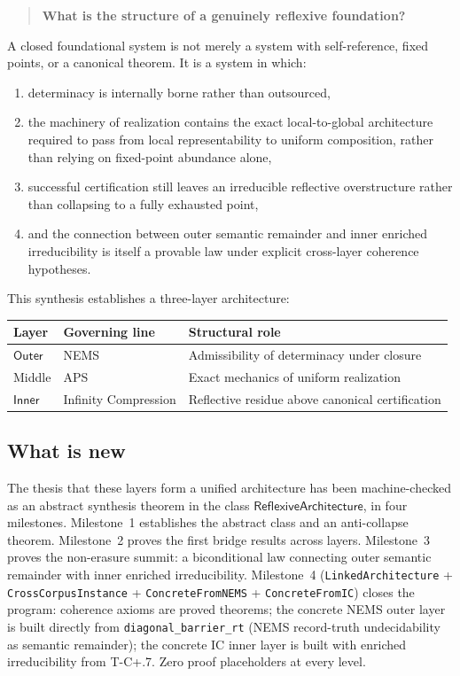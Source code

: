 \documentclass[11pt]{article}
\newcommand{\Outer}{\ensuremath{\mathsf{Outer}}}
\newcommand{\Inner}{\ensuremath{\mathsf{Inner}}}
\newcommand{\RAL}{\ensuremath{\mathsf{ReflexiveArchitecture}}}
\begin{document}
\begin{quote}
\textbf{What is the structure of a genuinely reflexive foundation?}
\end{quote}

A closed foundational system is not merely a system with self-reference, fixed points,
or a canonical theorem.  It is a system in which:
\begin{enumerate}[leftmargin=2em]
\item determinacy is internally borne rather than outsourced,
\item the machinery of realization contains the exact local-to-global architecture
required to pass from local representability to uniform composition, rather than
relying on fixed-point abundance alone,
\item successful certification still leaves an irreducible reflective overstructure
rather than collapsing to a fully exhausted point,
\item and the connection between outer semantic remainder and inner enriched
irreducibility is itself a provable law under explicit cross-layer coherence hypotheses.
\end{enumerate}

This synthesis establishes a three-layer architecture:

\begin{center}
\begin{tabular}{lll}
\toprule
Layer & Governing line & Structural role \\
\midrule
$\Outer$ & NEMS & Admissibility of determinacy under closure \\
Middle & APS & Exact mechanics of uniform realization \\
$\Inner$ & Infinity Compression & Reflective residue above canonical certification \\
\bottomrule
\end{tabular}
\end{center}

\subsection{What is new}

The thesis that these layers form a unified architecture has been machine-checked as an
abstract synthesis theorem in the class $\RAL$, in four milestones.  Milestone~1
establishes the abstract class and an anti-collapse theorem.  Milestone~2 proves the
first bridge results across layers.  Milestone~3 proves the non-erasure summit: a
biconditional law connecting outer semantic remainder with inner enriched irreducibility.
Milestone~4 (\texttt{LinkedArchitecture} + \texttt{CrossCorpusInstance} +
\texttt{ConcreteFromNEMS} + \texttt{ConcreteFromIC}) closes the program: coherence
axioms are proved theorems; the concrete NEMS outer layer is built directly from
\texttt{diagonal\_barrier\_rt} (NEMS record-truth undecidability as semantic remainder); the concrete
IC inner layer is built with enriched irreducibility from T-C+.7.  Zero proof
placeholders at every level.
\end{document}
